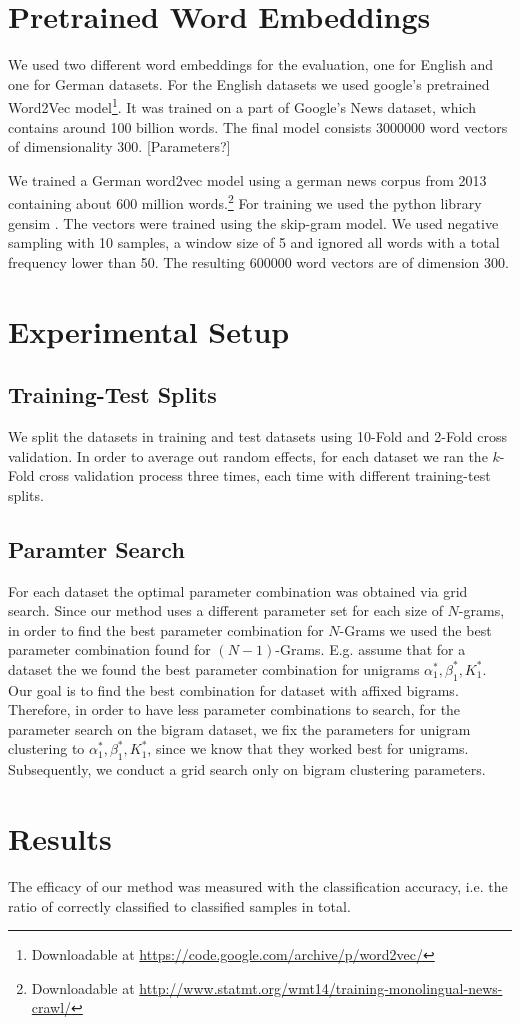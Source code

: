 \section{Pretrained Word Embeddings}

We used two different word embeddings for the evaluation, one for English and
one for German datasets. For the English datasets we used google's pretrained
Word2Vec model\footnote{Downloadable at
\url{https://code.google.com/archive/p/word2vec/}}. It was trained on a part of
Google's News dataset, which contains around 100 billion words. The final model consists 3000000 word vectors of
dimensionality 300. [Parameters?]

We trained a German word2vec model using a german news
corpus from 2013 containing about 600 million words.\footnote{Downloadable at
\url{http://www.statmt.org/wmt14/training-monolingual-news-crawl/}} For
training we used the python library gensim . The vectors were trained using
the skip-gram model. We used negative sampling with 10 samples, a window size of
5 and ignored all words with a total frequency lower than 50.  The
resulting 600000 word vectors are of dimension 300. 

\section{Experimental Setup}

\subsection{Training-Test Splits}

We split the datasets in training and test datasets using 10-Fold and 2-Fold cross
validation.
In order to average out random effects, for each dataset we ran the
$k$-Fold cross validation process three times, each time with different
training-test splits.


\subsection{Paramter Search}
For each dataset the optimal parameter combination was obtained via grid search. 
Since our method uses a different parameter set for each size of $N$-grams, in
order to find the best parameter combination for $N$-Grams we used the best
parameter combination found for $(N-1)$-Grams. E.g. assume that for a dataset
the we found the best parameter combination for unigrams $\alpha_1^*,
\beta_1^*, K_1^*$. Our goal is to find the best combination for dataset with
affixed bigrams. Therefore, in order to have less parameter combinations to
search, for the parameter search on the bigram dataset, we fix the
parameters for unigram clustering to $\alpha_1^*, \beta_1^*, K_1^*$, since we
know that they worked best for unigrams. Subsequently, we conduct a grid
search only on bigram clustering parameters.

\section{Results}

The efficacy of our method was measured with the classification accuracy, i.e.
the ratio of correctly classified to classified samples in total. 
